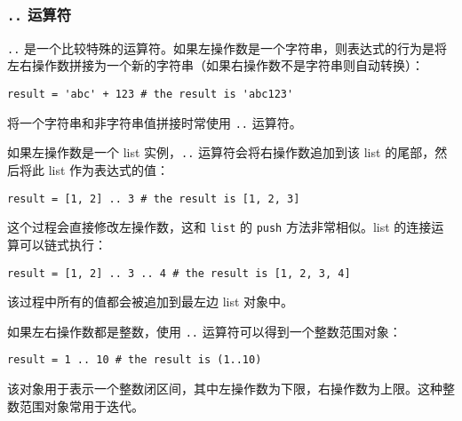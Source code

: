 \subsubsection{\texttt{..} 运算符}

\texttt{..} 是一个比较特殊的运算符。如果左操作数是一个字符串，则表达式的行为是将左右操作数拼接为一个新的字符串（如果右操作数不是字符串则自动转换）：
\begin{lstlisting}[language=berry, numbers=none]
result = 'abc' + 123 # the result is 'abc123'
\end{lstlisting}
将一个字符串和非字符串值拼接时常使用 \texttt{..} 运算符。

如果左操作数是一个 list 实例，\texttt{..} 运算符会将右操作数追加到该 list 的尾部，然后将此 list 作为表达式的值：
\begin{lstlisting}[language=berry, numbers=none]
result = [1, 2] .. 3 # the result is [1, 2, 3]
\end{lstlisting}
这个过程会直接修改左操作数，这和 \texttt{list} 的 \texttt{push} 方法非常相似。list 的连接运算可以链式执行：
\begin{lstlisting}[language=berry, numbers=none]
result = [1, 2] .. 3 .. 4 # the result is [1, 2, 3, 4]
\end{lstlisting}
该过程中所有的值都会被追加到最左边 list 对象中。

如果左右操作数都是整数，使用 \texttt{..} 运算符可以得到一个整数范围对象：
\begin{lstlisting}[language=berry, numbers=none]
result = 1 .. 10 # the result is (1..10)
\end{lstlisting}
该对象用于表示一个整数闭区间，其中左操作数为下限，右操作数为上限。这种整数范围对象常用于迭代。
